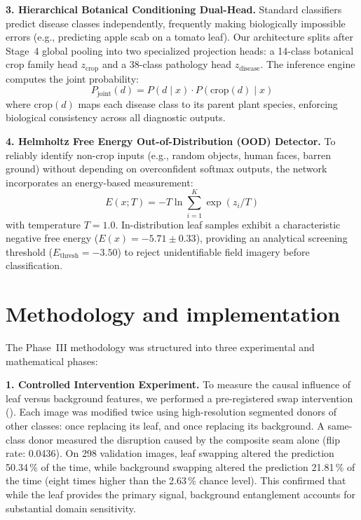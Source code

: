 \documentclass[12pt,a4paper]{report}
\begin{document}
\textbf{3. Hierarchical Botanical Conditioning Dual-Head.} Standard classifiers predict
disease classes independently, frequently making biologically impossible errors (e.g., predicting
apple scab on a tomato leaf). Our architecture splits after Stage~4 global pooling into two
specialized projection heads: a 14-class botanical crop family head $z_{\text{crop}}$ and a
38-class pathology head $z_{\text{disease}}$. The inference engine computes the joint probability:
\begin{equation}
P_{\text{joint}}(d) = P(d \mid x) \cdot P(\text{crop}(d) \mid x)
\end{equation}
where $\text{crop}(d)$ maps each disease class to its parent plant species, enforcing biological
consistency across all diagnostic outputs.

\textbf{4. Helmholtz Free Energy Out-of-Distribution (OOD) Detector.} To reliably identify
non-crop inputs (e.g., random objects, human faces, barren ground) without depending on overconfident
softmax outputs, the network incorporates an energy-based measurement:
\begin{equation}
E(x; T) = -T \ln \sum_{i=1}^K \exp(z_i / T)
\end{equation}
with temperature $T=1.0$. In-distribution leaf samples exhibit a characteristic negative free
energy ($E(x) = -5.71 \pm 0.33$), providing an analytical screening threshold ($E_{\text{thresh}} = -3.50$)
to reject unidentifiable field imagery before classification.

\section{Methodology and implementation}

The Phase~III methodology was structured into three experimental and mathematical phases:

\textbf{1. Controlled Intervention Experiment.} To measure the causal influence of leaf versus
background features, we performed a pre-registered swap intervention ().
Each image was modified twice using high-resolution segmented donors of other classes: once replacing
its leaf, and once replacing its background. A same-class donor measured the disruption caused by
the composite seam alone (flip rate: 0.0436). On 298 validation images, leaf swapping altered the
prediction 50.34\,\% of the time, while background swapping altered the prediction 21.81\,\% of the
time (eight times higher than the 2.63\,\% chance level). This confirmed that while the leaf provides
the primary signal, background entanglement accounts for substantial domain sensitivity.
\end{document}
